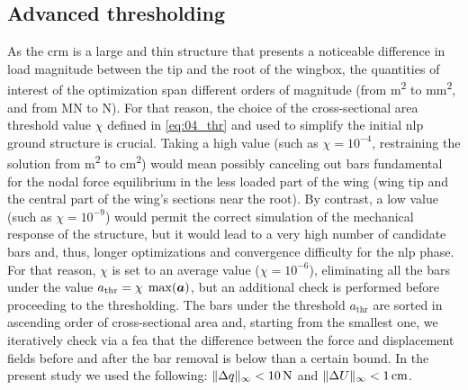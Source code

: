 \subsection{Advanced thresholding}
As the \gls{crm} is a large and thin structure that presents a noticeable difference in load magnitude between the tip and the root of the wingbox, the quantities of interest of the optimization span different orders of magnitude (from \unit{m^2} to \unit{mm^2}, and from \unit{MN} to \unit{N}). For that reason, the choice of the cross-sectional area threshold value $\chi$ defined in \eqref{eq:04_thr} and used to simplify the initial \gls{nlp} ground structure is crucial. Taking a high value (such as $\chi = 10^{-4}$, restraining the solution from \unit{m^2} to \unit{cm^2}) would mean possibly canceling out bars fundamental for the nodal force equilibrium in the less loaded part of the wing (wing tip and the central part of the wing's sections near the root). By contrast, a low value (such as $\chi=10^{-9}$) would permit the correct simulation of the mechanical response of the structure, but it would lead to a very high number of candidate bars and, thus, longer optimizations and convergence difficulty for the \gls{nlp} phase. For that reason, $\chi$ is set to an average value ($\chi=10^{-6}$), eliminating all the bars under the value $a_{\text{thr}}=\chi \; \max(\bm{a})$, but an additional check is performed before proceeding to the thresholding. The bars under the threshold $a_{\text{thr}}$ are sorted in ascending order of cross-sectional area and, starting from the smallest one, we iteratively check via a \gls{fea} that the difference between the force and displacement fields before and after the bar removal is below than a certain bound. In the present study we used the following: $\lVert\Delta q\rVert_{\infty}<\qty{10}{N}$ and $\lVert\Delta U\rVert_{\infty}<\qty{1}{cm}$.
